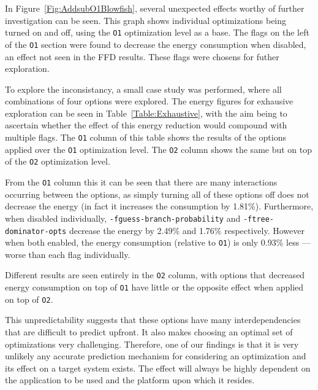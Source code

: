 \documentclass[twocolumn]{article}
\begin{document}
In Figure~\ref{Fig:AddsubO1Blowfish}, several unexpected effects worthy of further investigation can be seen. This graph shows individual optimizations being turned on and off, using the \texttt{O1} optimization level as a base. The flags on the left of the \texttt{O1} section were found to decrease the energy consumption when disabled, an effect not seen in the FFD results. These flags were chosens for futher exploration.

To explore the inconsistancy, a small case study was performed, where all combinations of four options were explored. The energy figures for exhausive exploration can be seen in Table~\ref{Table:Exhaustive}, with the aim being to ascertain whether the effect of this energy reduction would compound with multiple flags. The \texttt{O1} column of this table shows the results of the options applied over the \texttt{O1} optimization level. The \texttt{O2} column shows the same but on top of the \texttt{O2} optimization level.

From the \texttt{O1} column this it can be seen that there are many interactions occurring between the options, as simply turning all of these options off does not decrease the energy (in fact it increases the consumption by 1.81\%). Furthermore, when disabled individually, \texttt{-fguess-branch-probability} and \texttt{-ftree-dominator-opts} decrease the energy by 2.49\% and 1.76\% respectively. However when both enabled, the energy consumption (relative to \texttt{O1}) is only 0.93\% less --- worse than each flag individually.

Different results are seen entirely in the \texttt{O2} column, with options that decreased energy consumption on top of \texttt{O1} have little or the opposite effect when applied on top of \texttt{O2}.

This unpredictability suggests that these options have many interdependencies that are difficult to predict upfront. It also makes choosing an optimal set of optimizations very challenging. Therefore, one of our findings is that it is very unlikely any accurate prediction mechanism for considering an optimization and its effect on a target system exists. The effect will always be highly dependent on the application to be used and the platform upon which it resides.
\end{document}
